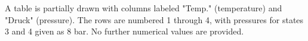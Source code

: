 A table is partially drawn with columns labeled "Temp." (temperature) and "Druck" (pressure). The rows are numbered 1 through 4, with pressures for states 3 and 4 given as 8 bar. No further numerical values are provided.